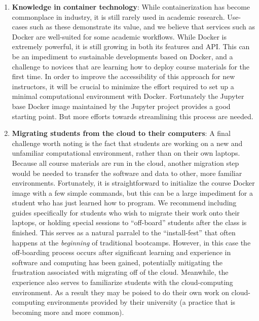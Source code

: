 \begin{enumerate}
\item {\bf Knowledge in container technology}: While containerization has become
commonplace in industry, it is still rarely used in academic research. Use-cases
such as these demonstrate its value, and we believe that services such as Docker
are well-suited for some academic workflows. While Docker is extremely powerful,
it is still growing in both its features and API. This can be an impediment to
sustainable developments based on Docker, and a challenge to novices that are
learning how to deploy course materials for the first time. In order to improve
the accessibility of this approach for new instructors, it will be crucial to
minimize the effort required to set up a minimal computational environment with
Docker. Fortunately the Jupyter base Docker image maintained by the Jupyter
project provides a good starting point. But more efforts towards streamlining
this process are needed.

\item {\bf Migrating students from the cloud to their computers}: A final
challenge worth noting is the fact that students are working on a new and
unfamiliar computational environment, rather than on their own laptops. Because
all course materials are run in the cloud, another migration step would be
needed to transfer the software and data to other, more familiar environments.
Fortunately, it is straightforward to initialize the course Docker image with a
few simple commands, but this can be a large impediment for a student who has
just learned how to program. We recommend including guides specifically for
students who wish to migrate their work onto their laptops, or holding special
sessions to ``off-board'' students after the class is finished. This serves as a
natural parralel to the ``install-fest'' that often happens at the
\emph{beginning} of traditional bootcamps. However, in this case the
off-boarding process occurs after significant learning and experience in
software and computing has been gained, potentially mitigating the frustration
associated with migrating off of the cloud. Meanwhile, the experience also
serves to familiarize students with the cloud-computing environment. As a result
they may be poised to do their own work on cloud- computing environments
provided by their university (a practice that is becoming more and more common).

\end{enumerate}
